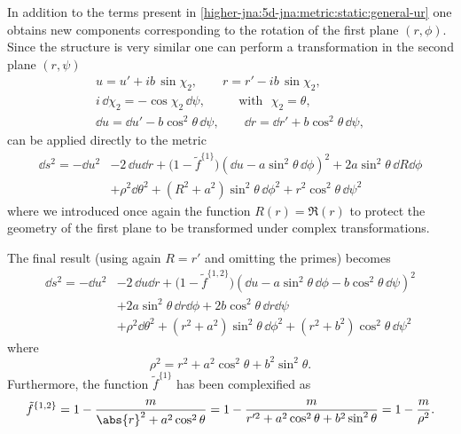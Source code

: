 In addition to the terms present in \eqref{higher-jna:5d-jna:metric:static:general-ur} one obtains new components corresponding to the rotation of the first plane $(r, \phi)$.
Since the structure is very similar one can perform a transformation\footnotemark{} in the second plane $(r, \psi)$%
\begin{equation}
	\label{higher-jna:eq:5d-ansatz-hopf-2}
	\begin{gathered}
		u = u' + i b\, \sin \chi_2, \qquad
		r = r' - i b\, \sin \chi_2, \\
		i\, \dd \chi_2 = - \cos \chi_2\, \dd\psi, \qquad \text{~~with~~}\chi_2 = \theta, \\
		\dd u = \dd u' - b \cos^2 \theta\, \dd\psi, \qquad
		\dd r = \dd r' + b \cos^2 \theta\, \dd\psi,
	\end{gathered}
\end{equation}
can be applied directly to the metric
\begin{equation}
	\begin{aligned}
	\dd s^2 = - \dd u^2 &- 2\, \dd u \dd r
		+ \big(1 - \tilde f^{\{1\}} \big) (\dd u - a \sin^2 \theta\, \dd \phi)^2
		+ 2 a \sin^2 \theta\, \dd R \dd \phi \\
		&+ \rho^2 \dd\theta^2
		+ (R^2 + a^2) \sin^2 \theta\, \dd\phi^2
		+ r^2 \cos^2 \theta\, \dd \psi^2
	\end{aligned}
\end{equation} 
where we introduced once again the function $R(r) = \Re(r)$ to protect the geometry of the first plane to be transformed under complex transformations.

The final result (using again $R = r'$ and omitting the primes) becomes
\begin{equation}
	\begin{aligned}
	\dd s^2 = - \dd u^2 &- 2\, \dd u \dd r
		+ \big(1 - \tilde f^{\{1, 2\}} \big) (\dd u - a \sin^2 \theta\, \dd \phi - b \cos^2 \theta\, \dd \psi)^2
		\\
		&+ 2 a \sin^2 \theta\, \dd r \dd \phi
		+ 2 b \cos^2 \theta\, \dd r\dd \psi \\
		&+ \rho^2 \dd\theta^2
		+ (r^2 + a^2) \sin^2 \theta\, \dd\phi^2
		+ (r^2 + b^2) \cos^2 \theta\, \dd \psi^2
	\end{aligned}
\end{equation} 
where
\begin{equation}
	\rho^2 = r^2 + a^2 \cos^2 \theta + b^2 \sin^2 \theta.
\end{equation} 
Furthermore, the function $\tilde f^{\{1\}}$ has been complexified as
\begin{equation}
 	\tilde f^{\{1,2\}} = 1 - \frac{m}{\abs{r}^2 + a^2 \cos^2 \theta}
		= 1 - \frac{m}{r'^2 + a^2 \cos^2 \theta + b^2 \sin^2 \theta}
		= 1 - \frac{m}{\rho^2}.
\end{equation}


